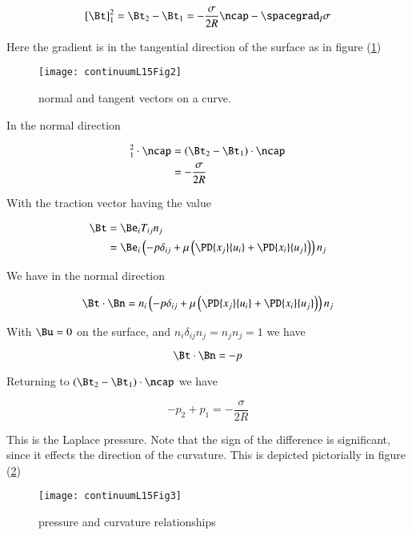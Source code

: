 \begin{equation}\label{eqn:continuumL15:130}
[\Bt]_1^2 = \Bt_2 - \Bt_1 = -\frac{\sigma}{2 R} \ncap - \spacegrad_I \sigma
\end{equation}

Here the gradient is in the tangential direction of the surface as in figure (\ref{fig:continuumL15:continuumL15Fig2})
\begin{figure}[htp]
   \centering
   \texttt{[image: continuumL15Fig2]}
   \caption{normal and tangent vectors on a curve.}\label{fig:continuumL15:continuumL15Fig2}
\end{figure}

In the normal direction

\begin{align*}
[\Bt]_1^2 \cdot \ncap
&= (\Bt_2 - \Bt_1) \cdot \ncap \\
&= -\frac{\sigma}{2 R} 
\end{align*}

With the traction vector having the value

\begin{align*}
\Bt 
&= \Be_i T_{ij} n_j \\
&= 
\Be_i \left( 
-p \delta_{ij} + \mu \left( 
\PD{x_j}{u_i}
+\PD{x_i}{u_j}
\right)
\right)
n_j
\end{align*}

We have in the normal direction

\begin{equation}\label{eqn:continuumL15:10}
\Bt \cdot \Bn 
=
n_i \left( 
-p \delta_{ij} + \mu \left( 
\PD{x_j}{u_i}
+\PD{x_i}{u_j}
\right)
\right) n_j
\end{equation}

With $\Bu = 0$ on the surface, and $n_i \delta_{ij} n_j = n_j n_j = 1$ we have

\begin{equation}\label{eqn:continuumL15:30}
\Bt \cdot \Bn = -p
\end{equation}

Returning to $(\Bt_2 - \Bt_1) \cdot \ncap$ we have

\begin{equation}\label{eqn:continuumL15:50}
\boxed{
-p_2 + p_1 = -\frac{\sigma}{2 R} 
}
\end{equation}

This is the Laplace pressure.  Note that the sign of the difference is significant, since it effects the direction of the curvature.  This is depicted pictorially in figure (\ref{fig:continuumL15:continuumL15Fig3})
\begin{figure}[htp]
   \centering
   \texttt{[image: continuumL15Fig3]}
   \caption{pressure and curvature relationships}\label{fig:continuumL15:continuumL15Fig3}
\end{figure}

